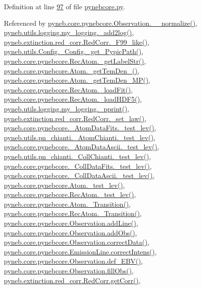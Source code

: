 Definition at line \hyperlink{pynebcore_8py_source_l00097}{97} of file \hyperlink{pynebcore_8py_source}{pynebcore.\-py}.



Referenced by \hyperlink{pynebcore_8py_source_l04007}{pyneb.\-core.\-pynebcore.\-Observation.\-\_\-\-\_\-normalize()}, \hyperlink{logging_8py_source_l00059}{pyneb.\-utils.\-logging.\-my\-\_\-logging.\-\_\-add2log()}, \hyperlink{red__corr_8py_source_l00658}{pyneb.\-extinction.\-red\-\_\-corr.\-Red\-Corr.\-\_\-\-F99\-\_\-like()}, \hyperlink{_config_8py_source_l00115}{pyneb.\-utils.\-Config.\-\_\-\-Config.\-\_\-get\-\_\-\-Pypic\-Path()}, \hyperlink{pynebcore_8py_source_l02970}{pyneb.\-core.\-pynebcore.\-Rec\-Atom.\-\_\-get\-Label\-Str()}, \hyperlink{pynebcore_8py_source_l01869}{pyneb.\-core.\-pynebcore.\-Atom.\-\_\-get\-Tem\-Den\-\_()}, \hyperlink{pynebcore_8py_source_l02046}{pyneb.\-core.\-pynebcore.\-Atom.\-\_\-get\-Tem\-Den\-\_\-\-M\-P()}, \hyperlink{pynebcore_8py_source_l02754}{pyneb.\-core.\-pynebcore.\-Rec\-Atom.\-\_\-load\-Fit()}, \hyperlink{pynebcore_8py_source_l02714}{pyneb.\-core.\-pynebcore.\-Rec\-Atom.\-\_\-load\-H\-D\-F5()}, \hyperlink{logging_8py_source_l00051}{pyneb.\-utils.\-logging.\-my\-\_\-logging.\-\_\-pprint()}, \hyperlink{red__corr_8py_source_l00176}{pyneb.\-extinction.\-red\-\_\-corr.\-Red\-Corr.\-\_\-set\-\_\-law()}, \hyperlink{pynebcore_8py_source_l00178}{pyneb.\-core.\-pynebcore.\-\_\-\-Atom\-Data\-Fits.\-\_\-test\-\_\-lev()}, \hyperlink{pn__chianti_8py_source_l00304}{pyneb.\-utils.\-pn\-\_\-chianti.\-\_\-\-Atom\-Chianti.\-\_\-test\-\_\-lev()}, \hyperlink{pynebcore_8py_source_l00447}{pyneb.\-core.\-pynebcore.\-\_\-\-Atom\-Data\-Ascii.\-\_\-test\-\_\-lev()}, \hyperlink{pn__chianti_8py_source_l00472}{pyneb.\-utils.\-pn\-\_\-chianti.\-\_\-\-Coll\-Chianti.\-\_\-test\-\_\-lev()}, \hyperlink{pynebcore_8py_source_l00677}{pyneb.\-core.\-pynebcore.\-\_\-\-Coll\-Data\-Fits.\-\_\-test\-\_\-lev()}, \hyperlink{pynebcore_8py_source_l01045}{pyneb.\-core.\-pynebcore.\-\_\-\-Coll\-Data\-Ascii.\-\_\-test\-\_\-lev()}, \hyperlink{pynebcore_8py_source_l01525}{pyneb.\-core.\-pynebcore.\-Atom.\-\_\-test\-\_\-lev()}, \hyperlink{pynebcore_8py_source_l02672}{pyneb.\-core.\-pynebcore.\-Rec\-Atom.\-\_\-test\-\_\-lev()}, \hyperlink{pynebcore_8py_source_l01433}{pyneb.\-core.\-pynebcore.\-Atom.\-\_\-\-Transition()}, \hyperlink{pynebcore_8py_source_l02812}{pyneb.\-core.\-pynebcore.\-Rec\-Atom.\-\_\-\-Transition()}, \hyperlink{pynebcore_8py_source_l03558}{pyneb.\-core.\-pynebcore.\-Observation.\-add\-Line()}, \hyperlink{pynebcore_8py_source_l03589}{pyneb.\-core.\-pynebcore.\-Observation.\-add\-Obs()}, \hyperlink{pynebcore_8py_source_l04028}{pyneb.\-core.\-pynebcore.\-Observation.\-correct\-Data()}, \hyperlink{pynebcore_8py_source_l03447}{pyneb.\-core.\-pynebcore.\-Emission\-Line.\-correct\-Intens()}, \hyperlink{pynebcore_8py_source_l03983}{pyneb.\-core.\-pynebcore.\-Observation.\-def\-\_\-\-E\-B\-V()}, \hyperlink{pynebcore_8py_source_l03574}{pyneb.\-core.\-pynebcore.\-Observation.\-fill\-Obs()}, \hyperlink{red__corr_8py_source_l00211}{pyneb.\-extinction.\-red\-\_\-corr.\-Red\-Corr.\-get\-Corr()}, 